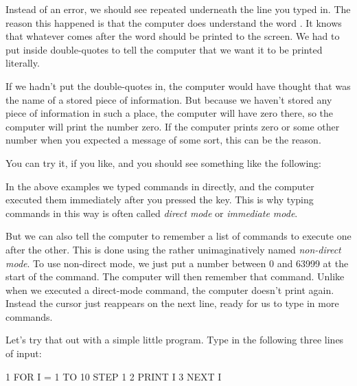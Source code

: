   Instead of an error, we should see  repeated underneath
  the line you typed in.  The reason this happened is that the computer
  does understand the word .  It knows that whatever comes after
  the word  should be printed to the screen.  We had to put  inside double-quotes to tell the computer that we want it to be
  printed literally.

  If we hadn't put the double-quotes in, the computer would have thought
  that  was the name of a stored piece of information.
  But because we haven't stored any piece of information in such a place,
  the computer will have zero there, so the computer will print the number
  zero. If the computer prints zero or some other number when
  you expected a message of some sort, this can be the reason.

\needspace{4cm} %
  You can try it, if you like, and you should see something like the following:


  In the above examples we typed commands in directly, and the computer executed
  them immediately after you pressed the  key.  This is why
  typing commands in this way is often called {\em direct mode} or {\em immediate mode}.

  But we can also tell the computer to remember a list of commands to execute one
  after the other.   This is done using the rather unimaginatively named {\em non-direct mode}.
  To use non-direct mode, we just put a number between 0 and 63999 at the start of
  the command.  The computer will then remember that command.  Unlike when we executed
  a direct-mode command, the computer doesn't print  again. Instead the cursor
  just reappears on the next line, ready for us to type in more commands.

\needspace{4cm} %
  Let's try that out with a simple little program.  Type in the following three lines of
  input:

\begin{screenoutput}
1 FOR I = 1 TO 10 STEP 1
2 PRINT I
3 NEXT I
\end{screenoutput}

